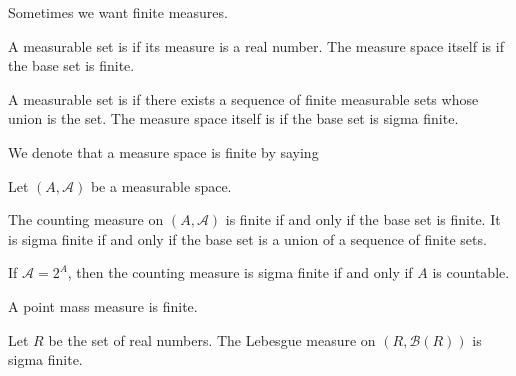 \sbasic


\sstart



Sometimes we want finite measures.


A measurable set is
if its measure is a real number.
The measure space itself is
if the base set is finite.

A measurable set is
if there exists a sequence of
finite measurable sets whose
union is the set.
The measure space itself is
if the base set is sigma finite.


We denote that a measure
space is finite by saying

\begin{expl}
Let $(A, \mathcal{A})$ be a measurable space.

The counting measure on $(A, \mathcal{A})$ is
finite if and only if the base set is finite.
It is sigma finite if and only if the base
set is a union of a sequence of finite sets.

If $\mathcal{A} = 2^A$, then the counting
measure is sigma finite if and only if
$A$ is countable.
\end{expl}

\begin{expl}
A point mass measure is finite.
\end{expl}

\begin{expl}
Let $R$ be the set of real numbers.
The Lebesgue measure on
$(R, \mathcal{B}(R))$ is sigma finite.
\end{expl}

\strats
